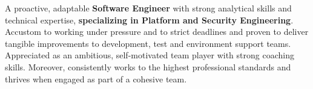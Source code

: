 \documentclass[]{cv}
\begin{document}
\begin{minipage}[t]{0.70\textwidth}

\sectionsep
A proactive, adaptable \textbf{Software Engineer} with strong analytical skills and technical expertise, \textbf{specializing in Platform and Security Engineering}.  Accustom to working under pressure and to strict deadlines and proven to deliver tangible improvements to development, test and environment support teams.  Appreciated as an ambitious, self-motivated team player with strong coaching skills.  Moreover, consistently works to the highest professional standards and thrives when engaged as part of a cohesive team.


\end{minipage}
\end{document}
